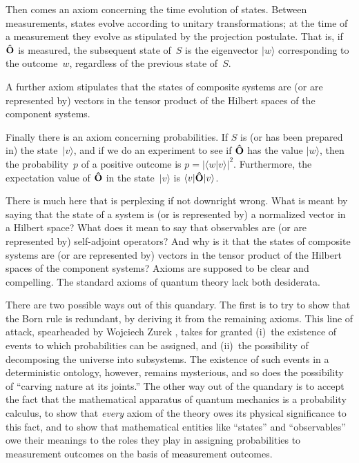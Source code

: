 \documentclass[12pt]{article}
\newcommand{\braket}[2]{\langle#1|#2\rangle}
\newcommand{\ket}[1]{|#1\rangle}
\newcommand{\hO}{{\bf\hat O}}
\newcommand{\sandwich}[3]{\langle#1\vert#2\vert#3\rangle}
\begin{document}
Then comes an axiom concerning the time evolution of states. Between measurements, states evolve according to unitary transformations; at the time of a measurement they evolve as stipulated by the projection postulate. That is, if $\hO$ is measured, the subsequent state of~$S$ is the eigenvector $\ket w$ corresponding to the outcome~$w$, regardless of the previous state of~$S$.

A further axiom stipulates that the states of composite systems are (or are represented by) vectors in the tensor product of the Hilbert spaces of the component systems.

Finally there is an axiom concerning probabilities. If $S$ is (or has been prepared in) the state~$\ket v$, and if we do an experiment to see if $\hO$ has the value $\ket w$, then the probability~$p$ of a positive outcome is $p=|\braket wv|^2$. Furthermore, the expectation value of $\hO$ in the state~$\ket v$ is $\sandwich v\hO v$.

There is much here that is perplexing if not downright wrong. What is meant by saying that the state of a system is (or is represented by) a normalized vector in a Hilbert space? What does it mean to say that observables are (or are represented by) self-adjoint operators? And why is it that the states of composite systems are (or are represented by) vectors in the tensor product of the Hilbert spaces of the component systems? Axioms are supposed to be clear and compelling. The standard axioms of quantum theory lack both desiderata.

There are two possible ways out of this quandary. The first is to try to show that the Born rule is redundant, by deriving it from the remaining axioms. This line of attack, spearheaded by Wojciech Zurek \cite{Zurek2003a,Zurek2003b,Zurek2005envariance}, takes for granted (i)~the existence of events to which probabilities can be assigned, and (ii)~the possibility of decomposing the universe into subsystems. The existence of such events in a deterministic ontology, however, remains mysterious, and so does the possibility of ``carving nature at its joints.'' The other way out of the quandary is to accept the fact that the mathematical apparatus of quantum mechanics is a probability calculus, to show that \textit{every} axiom of the theory owes its physical significance to this fact, and to show that mathematical entities like ``states'' and ``observables'' owe their meanings to the roles they play in assigning probabilities to measurement outcomes on the basis of measurement outcomes.
\end{document}

